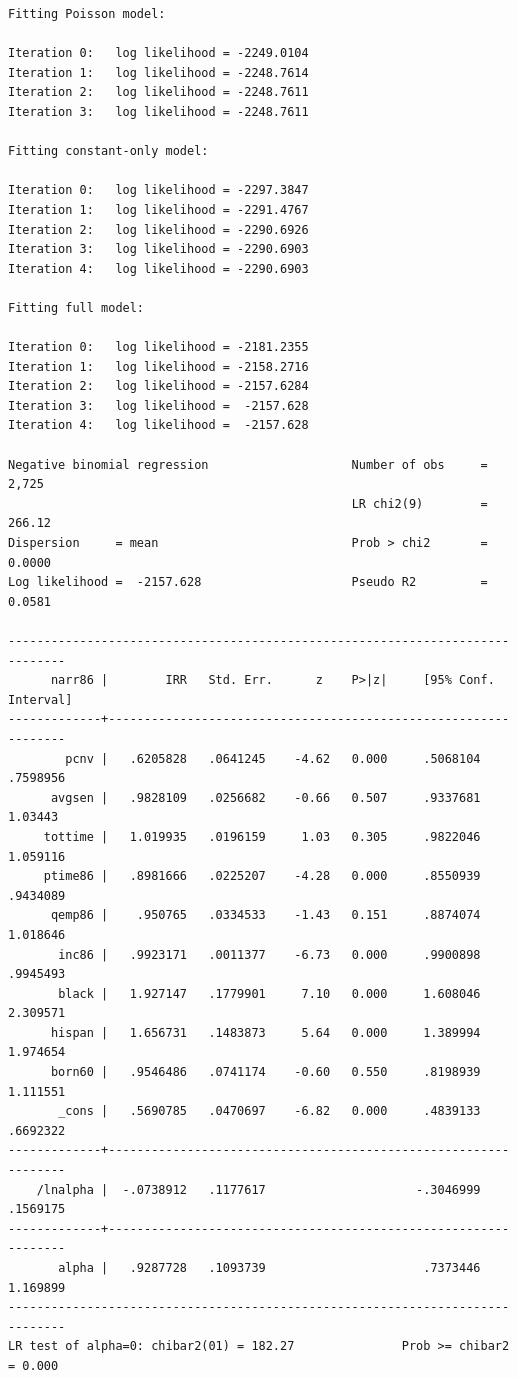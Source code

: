 \documentclass[
]{book}
\begin{document}
\begin{verbatim}
Fitting Poisson model:

Iteration 0:   log likelihood = -2249.0104  
Iteration 1:   log likelihood = -2248.7614  
Iteration 2:   log likelihood = -2248.7611  
Iteration 3:   log likelihood = -2248.7611  

Fitting constant-only model:

Iteration 0:   log likelihood = -2297.3847  
Iteration 1:   log likelihood = -2291.4767  
Iteration 2:   log likelihood = -2290.6926  
Iteration 3:   log likelihood = -2290.6903  
Iteration 4:   log likelihood = -2290.6903  

Fitting full model:

Iteration 0:   log likelihood = -2181.2355  
Iteration 1:   log likelihood = -2158.2716  
Iteration 2:   log likelihood = -2157.6284  
Iteration 3:   log likelihood =  -2157.628  
Iteration 4:   log likelihood =  -2157.628  

Negative binomial regression                    Number of obs     =      2,725
                                                LR chi2(9)        =     266.12
Dispersion     = mean                           Prob > chi2       =     0.0000
Log likelihood =  -2157.628                     Pseudo R2         =     0.0581

------------------------------------------------------------------------------
      narr86 |        IRR   Std. Err.      z    P>|z|     [95% Conf. Interval]
-------------+----------------------------------------------------------------
        pcnv |   .6205828   .0641245    -4.62   0.000     .5068104    .7598956
      avgsen |   .9828109   .0256682    -0.66   0.507     .9337681     1.03443
     tottime |   1.019935   .0196159     1.03   0.305     .9822046    1.059116
     ptime86 |   .8981666   .0225207    -4.28   0.000     .8550939    .9434089
      qemp86 |    .950765   .0334533    -1.43   0.151     .8874074    1.018646
       inc86 |   .9923171   .0011377    -6.73   0.000     .9900898    .9945493
       black |   1.927147   .1779901     7.10   0.000     1.608046    2.309571
      hispan |   1.656731   .1483873     5.64   0.000     1.389994    1.974654
      born60 |   .9546486   .0741174    -0.60   0.550     .8198939    1.111551
       _cons |   .5690785   .0470697    -6.82   0.000     .4839133    .6692322
-------------+----------------------------------------------------------------
    /lnalpha |  -.0738912   .1177617                     -.3046999    .1569175
-------------+----------------------------------------------------------------
       alpha |   .9287728   .1093739                      .7373446    1.169899
------------------------------------------------------------------------------
LR test of alpha=0: chibar2(01) = 182.27               Prob >= chibar2 = 0.000
\end{verbatim}
\end{document}
